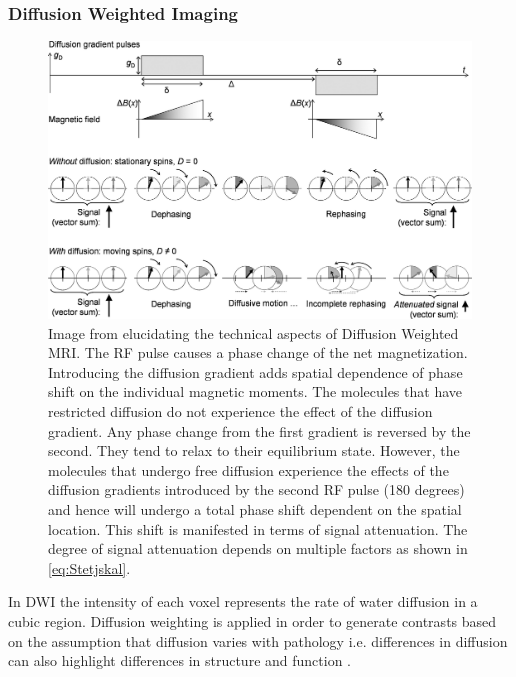 \documentclass[msthesis.tex]{subfiles}
\begin{document}
\subsubsection{Diffusion Weighted Imaging}
\begin{figure}
    \centering
    \includegraphics[width=\textwidth]{images/diffusionmri.jpg}
    \caption{Image from \cite{technical_aspects_dmri} elucidating the technical aspects of Diffusion Weighted MRI. The RF pulse causes a phase change of the net magnetization. Introducing the diffusion gradient adds spatial dependence of phase shift on the individual magnetic moments. The molecules that have restricted diffusion do not experience the effect of the diffusion gradient. Any phase change from the first gradient is reversed by the second. They tend to relax to their equilibrium state. However, the molecules that undergo free diffusion experience the effects of the diffusion gradients introduced by the second RF pulse (180 degrees) and hence will undergo a total phase shift dependent on the spatial location. This shift is manifested in terms of signal attenuation. The degree of signal attenuation depends on multiple factors as shown in \cref{eq:Stetjskal}.}
    \label{fig:diffmri}
\end{figure}
\label{sec:DWI}
In \gls{DWI} the intensity of each voxel represents the rate of water diffusion in a cubic region. Diffusion weighting is applied in order to generate contrasts based on the assumption that diffusion varies with pathology i.e. differences in diffusion can also highlight differences in structure and function \citep{Taylor_1985}. 
\end{document}
